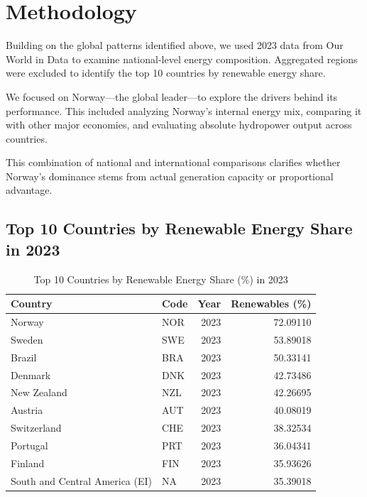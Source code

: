 \documentclass[
  letterpaper,
  DIV=11,
  numbers=noendperiod]{scrartcl}
\begin{document}
\newpage

\section{Methodology}\label{methodology}

Building on the global patterns identified above, we used 2023 data from
Our World in Data to examine national-level energy composition.
Aggregated regions were excluded to identify the top 10 countries by
renewable energy share.

We focused on Norway---the global leader---to explore the drivers behind
its performance. This included analyzing Norway's internal energy mix,
comparing it with other major economies, and evaluating absolute
hydropower output across countries.

This combination of national and international comparisons clarifies
whether Norway's dominance stems from actual generation capacity or
proportional advantage.

\subsection{Top 10 Countries by Renewable Energy Share in
2023}\label{top-10-countries-by-renewable-energy-share-in-2023}

\begin{longtable}[]{@{}llrr@{}}

\caption{\label{tbl-table-top10}Top 10 Countries by Renewable Energy
Share (\%) in 2023}

\tabularnewline

\toprule\noalign{}
Country & Code & Year & Renewables (\%) \\
\midrule\noalign{}
\endhead
\bottomrule\noalign{}
\endlastfoot
Norway & NOR & 2023 & 72.09110 \\
Sweden & SWE & 2023 & 53.89018 \\
Brazil & BRA & 2023 & 50.33141 \\
Denmark & DNK & 2023 & 42.73486 \\
New Zealand & NZL & 2023 & 42.26695 \\
Austria & AUT & 2023 & 40.08019 \\
Switzerland & CHE & 2023 & 38.32534 \\
Portugal & PRT & 2023 & 36.04341 \\
Finland & FIN & 2023 & 35.93626 \\
South and Central America (EI) & NA & 2023 & 35.39018 \\

\end{longtable}
\end{document}
